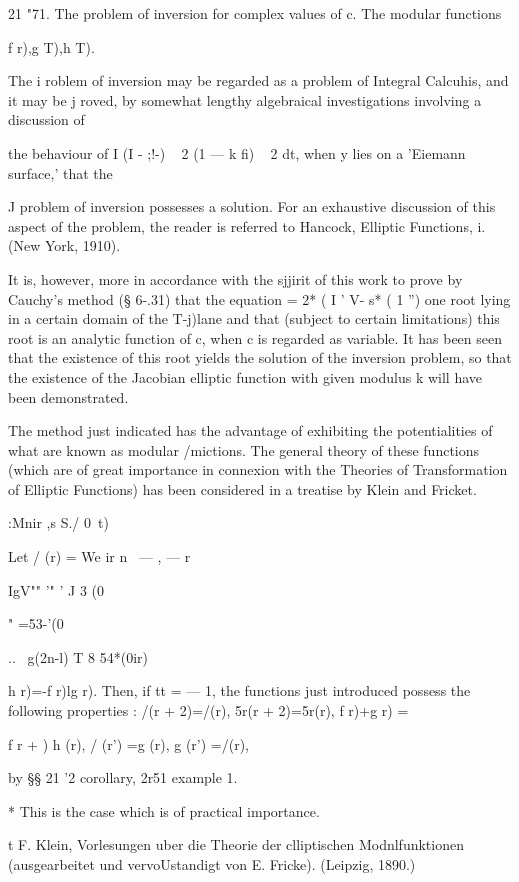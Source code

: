 21 "71. The problem of inversion for complex values of c. The modular
functions

f r),g T),h T).

The i roblem of inversion may be regarded as a problem of Integral
Calcuhis, and it may be j roved, by somewhat lengthy algebraical
investigations involving a discussion of

the behaviour of I (I - ;!-) ~ 2 (1 — k fi) ~ 2 dt, when y lies on a
'Eiemann surface,' that the

J problem of inversion possesses a solution. For an exhaustive
discussion of this aspect of the problem, the reader is referred to
Hancock, Elliptic Functions, i. (New York, 1910).

It is, however, more in accordance with the sjjirit of this work to
prove by Cauchy's method (§ 6-.31) that the equation = 2* ( I ' V- s*
( 1 '') one root lying in a certain domain of the T-j)lane and that
(subject to certain limitations) this root is an analytic function of
c, when c is regarded as variable. It has been seen that the existence
of this root yields the solution of the inversion problem, so that the
existence of the Jacobian elliptic function with given modulus k will
have been demonstrated.

The method just indicated has the advantage of exhibiting the
potentialities of what are known as modular /mictions. The general
theory of these functions (which are of great importance in connexion
with the Theories of Transformation of Elliptic Functions) has been
considered in a treatise by Klein and Fricket.

:Mnir ,s S./ 0\ t)



Let / (r) = We ir n \ — , — r \



IgV"" '" ' J 3 (0

" =53-'(0



.. \ g(2n-l) T 8 54*(0ir)



h r)=-f r)lg r). Then, if tt = — 1, the functions just introduced
possess the following properties : /(r + 2)=/(r), 5r(r + 2)=5r(r), f
r)+g r) = \,

f r + ) h (r), / (r') =g (r), g (r') =/(r),

by §§ 21 '2 corollary, 2r51 example 1.

* This is the case which is of practical importance.

t F. Klein, Vorlesungen uber die Theorie der clliptischen
Modnlfunktionen (ausgearbeitet und vervoUstandigt von E. Fricke).
(Leipzig, 1890.)

